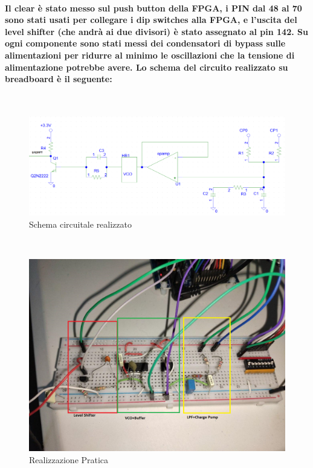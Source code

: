 \documentclass[a4paper]{article}
\begin{document}
\paragraph{Il clear è stato messo sul push button della FPGA, i PIN dal 48 al 70 sono stati usati per collegare i dip switches alla FPGA, e l'uscita del level shifter (che andrà ai due divisori) è stato assegnato al pin 142. Su ogni componente sono stati messi dei condensatori di bypass sulle alimentazioni per ridurre al minimo le oscillazioni che la tensione di alimentazione potrebbe avere.
Lo schema del circuito realizzato su breadboard è il seguente:}
 ~\begin{figure}[H]%
\includegraphics[scale=0.35]{SchemaCirc.png} 
\centering
\caption{Schema circuitale realizzato}
\label{fig:foo}
\end{figure}

 ~\begin{figure}[h]%
\includegraphics[scale=0.3]{Circuito.png} 
\centering
\caption{Realizzazione Pratica}
\label{fig:foo}
\end{figure}
\newpage
\end{document}
